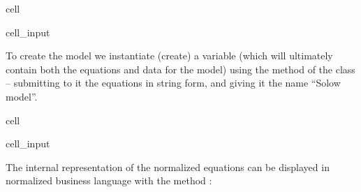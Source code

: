 \documentclass[letterpaper,10pt,english]{jupyterBook}
\begin{document}
\begin{sphinxuseclass}{cell}\begin{sphinxVerbatimInput}

\begin{sphinxuseclass}{cell_input}
\begin{sphinxVerbatim}[commandchars=\\\{\}]
  
\end{sphinxVerbatim}

\end{sphinxuseclass}\end{sphinxVerbatimInput}

\end{sphinxuseclass}
\sphinxAtStartPar
To create the model we instantiate (create) a variable  (which will ultimately contain both the equations and data for the model) using the  method of the  class – submitting to it the equations in string form, and giving it the name “Solow model”.

\begin{sphinxuseclass}{cell}\begin{sphinxVerbatimInput}

\begin{sphinxuseclass}{cell_input}
\begin{sphinxVerbatim}[commandchars=\\\{\}]
  
\end{sphinxVerbatim}

\end{sphinxuseclass}\end{sphinxVerbatimInput}

\end{sphinxuseclass}
\sphinxAtStartPar
The internal representation of the normalized equations can be displayed in normalized business language with the  method :
\end{document}

